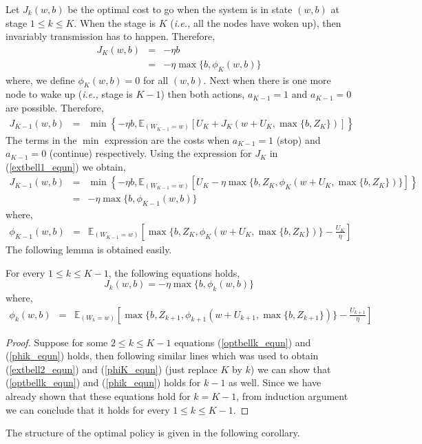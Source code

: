 \documentclass[onecolumn]{IEEEtran}
\begin{document}
Let $J_k(w,b)$ be the optimal cost to go when the system is in state
$(w,b)$ at stage $1\le k\le K$. When the stage is $K$ (\emph{i.e.,}
all the nodes have woken up), then invariably transmission has to
happen. Therefore,
\begin{eqnarray}
	\label{extbell1_equn}
	J_{K}(w,b)&=&-\eta b\nonumber\\
	&=&-\eta\max\{b,\phi_{K}(w,b)\}
\end{eqnarray}
where, we define $\phi_{K}(w,b)=0$ for all $(w,b)$. Next when there is
one more node to wake up (\emph{i.e.,} stage is $K-1$) then both actions,
$a_{K-1}=1$ and $a_{K-1}=0$ are possible. Therefore,
\begin{eqnarray*}
  {J_{K-1}(w,b)}&=&\min\left\{-\eta b,\mathbb{E}_{(W_{K-1}=w)}\left[{U}_{K}+
   J_{K}(w+{U}_{K},\max\{b,Z_{K}\})\right]\right\}\nonumber
\end{eqnarray*}
The terms in the $\min$ expression are the costs when $a_{K-1}=1$
(stop) and $a_{K-1}=0$ (continue) respectively. Using the expression
for $J_K$ in (\ref{extbell1_equn}) we obtain,
\begin{eqnarray}
\label{extbell2_equn}
{J_{K-1}(w,b)}
&=&\min\left\{-\eta b, \mathbb{E}_{(W_{K-1}=w)}\left[{U}_{K}-\eta\max\{b,Z_{K},
\phi_{K}(w+{U}_{K},\max\{b,Z_{K}\})\}\right]\right\}\nonumber\\
&=&-\eta\max\{b,\phi_{K-1}(w,b)\}
\end{eqnarray}
where,
\begin{eqnarray} 
\label{phiK_equn}
\phi_{K-1}(w,b)&=&\mathbb{E}_{(W_{K-1}=w)}\left[\max\{b,Z_{K},\phi_{K}(w+{U}_{K},
\max\{b,Z_{K}\})\}-\frac{{U}_{K}}{\eta}\right]
\end{eqnarray}
The following lemma is obtained easily.
\begin{lemma}
For every $1\le k\le K-1$, the following equations holds,
\begin{equation}
	\label{optbellk_equn}
	J_k(w,b)=-\eta\max\{b,\phi_k(w,b)\}
\end{equation}
where,
\begin{eqnarray}
	\label{phik_equn}
	\phi_{k}(w,b)&=&\mathbb{E}_{(W_k=w)}\left[\max\{b,Z_{k+1},\phi_{k+1}(w+{U}_{k+1},
	\max\{b,Z_{k+1}\})\} -\frac{{U}_{k+1}}{\eta}\right]
\end{eqnarray}
\end{lemma}
\begin{proof}
Suppose for some $2\le k\le K-1$ equations (\ref{optbellk_equn}) and
  (\ref{phik_equn}) holds, then following similar lines which was used
  to obtain  (\ref{extbell2_equn}) and (\ref{phiK_equn})
  (just replace $K$ by $k$) we can show that 
  (\ref{optbellk_equn}) and (\ref{phik_equn}) holds for $k-1$ as well.
  Since we have already shown that these equations hold for $k=K-1$,
  from induction argument we can conclude that it holds for every
  $1\le k\le K-1$.
\end{proof}
\noindent
The structure of the optimal policy is given in the following corollary.
\end{document}
